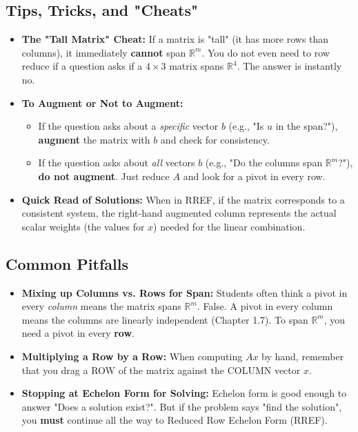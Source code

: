 \documentclass{article}
\begin{document}
\subsection{Tips, Tricks, and "Cheats"}
\begin{itemize}
    \item \textbf{The "Tall Matrix" Cheat:} If a matrix is "tall" (it has more rows than columns), it immediately \textbf{cannot} span $\mathbb{R}^m$. You do not even need to row reduce if a question asks if a $4 \times 3$ matrix spans $\mathbb{R}^4$. The answer is instantly no.
    \item \textbf{To Augment or Not to Augment:}
        \begin{itemize}
            \item If the question asks about a \textit{specific} vector $b$ (e.g., "Is $u$ in the span?"), \textbf{augment} the matrix with $b$ and check for consistency.
            \item If the question asks about \textit{all} vectors $b$ (e.g., "Do the columns span $\mathbb{R}^m$?"), \textbf{do not augment}. Just reduce $A$ and look for a pivot in every row.
        \end{itemize}
    \item \textbf{Quick Read of Solutions:} When in RREF, if the matrix corresponds to a consistent system, the right-hand augmented column represents the actual scalar weights (the values for $x$) needed for the linear combination. 
\end{itemize}

\subsection{Common Pitfalls}
\begin{itemize}
    \item \textbf{Mixing up Columns vs. Rows for Span:} Students often think a pivot in every \textit{column} means the matrix spans $\mathbb{R}^m$. False. A pivot in every column means the columns are linearly independent (Chapter 1.7). To span $\mathbb{R}^m$, you need a pivot in every \textbf{row}. 
    \item \textbf{Multiplying a Row by a Row:} When computing $Ax$ by hand, remember that you drag a ROW of the matrix against the COLUMN vector $x$. 
    \item \textbf{Stopping at Echelon Form for Solving:} Echelon form is good enough to answer "Does a solution exist?". But if the problem says "find the solution", you \textbf{must} continue all the way to Reduced Row Echelon Form (RREF).
\end{itemize}
\end{document}

